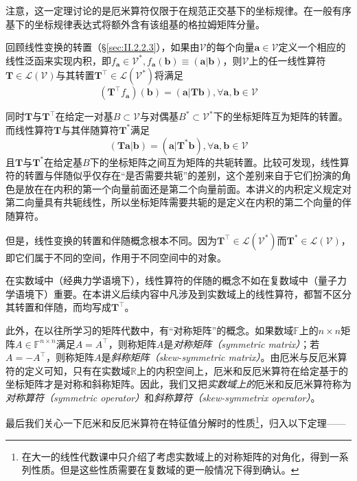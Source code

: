 \documentclass[main.tex]{subfiles}
\begin{document}
注意，这一定理讨论的是厄米算符仅限于在规范正交基下的坐标规律。在一般有序基下的坐标规律表达式将额外含有该组基的格拉姆矩阵分量。

回顾线性变换的转置（\S\ref{sec:II.2.2.3}），如果由$\mathcal{V}$的每个向量$\mathbf{a}\in\mathcal{V}$定义一个相应的线性泛函来实现内积，即$f_\mathbf{a}\in\mathcal{V}^*,f_\mathbf{a}\left(\mathbf{b}\right)\equiv\left(\mathbf{a}|\mathbf{b}\right)$，则$\mathcal{V}$上的任一线性算符$\mathbf{T}\in\mathcal{L}\left(\mathcal{V}\right)$与其转置$\mathbf{T}^\intercal\in\mathcal{L}\left(\mathcal{V}^*\right)$将满足
\[
    \left(\mathbf{T}^\intercal f_\mathbf{a}\right)\left(\mathbf{b}\right)=\left(\mathbf{a}|\mathbf{Tb}\right),\forall\mathbf{a},\mathbf{b}\in\mathcal{V}
\]

同时$\mathbf{T}$与$\mathbf{T}^\intercal$在给定一对基$B\subset\mathcal{V}$与对偶基$B^*\subset\mathcal{V}^*$下的坐标矩阵互为矩阵的转置。而线性算符$\mathbf{T}$与其伴随算符$\mathbf{T}^*$满足
\[
    \left(\mathbf{Ta}|\mathbf{b}\right)=\left(\mathbf{a}|\mathbf{T}^*\mathbf{b}\right),\forall\mathbf{a},\mathbf{b}\in\mathcal{V}
\]
且$\mathbf{T}$与$\mathbf{T}^*$在给定基$B$下的坐标矩阵之间互为矩阵的共轭转置。比较可发现，线性算符的转置与伴随似乎仅存在“是否需要共轭”的差别，这个差别来自于它们扮演的角色是放在在内积的第一个向量前面还是第二个向量前面。本讲义的内积定义规定对第二向量具有共轭线性，所以坐标矩阵需要共轭的是定义在内积的第二个向量的伴随算符。

但是，线性变换的转置和伴随概念根本不同。因为$\mathbf{T}^\intercal\in\mathcal{L}\left(\mathcal{V}^*\right)$而$\mathbf{T}^*\in\mathcal{L}\left(\mathcal{V}\right)$，即它们属于不同的空间，作用于不同空间中的对象。

在实数域中（经典力学语境下），线性算符的伴随的概念不如在复数域中（量子力学语境下）重要。在本讲义后续内容中凡涉及到实数域上的线性算符，都暂不区分其转置和伴随，而均写成$\mathbf{T}^\intercal$。

此外，在以往所学习的矩阵代数中，有“对称矩阵”的概念。如果数域$\mathbb{F}$上的$n\times n$矩阵$A\in\mathbb{F}^{n\times n}$满足$A=A^\intercal$，则称矩阵$A$是\emph{对称矩阵（symmetric matrix）}；若$A=-A^\intercal$，则称矩阵$A$是\emph{斜称矩阵（skew-symmetric matrix）}。由厄米与反厄米算符的定义可知，只有在实数域$\mathbb{R}$上的内积空间上，厄米和反厄米算符在给定基于的坐标矩阵才是对称和斜称矩阵。因此，我们又把\emph{实数域上的}厄米和反厄米算符称为\emph{对称算符（symmetric operator）}和\emph{斜称算符（skew-symmetrix operator）}。

最后我们关心一下厄米和反厄米算符在特征值分解时的性质\footnote{在大一的线性代数课中只介绍了考虑实数域上的对称矩阵的对角化\cite[\S 5.3 定理3.4~3.6、例3.4]{周胜林2012线性代数}，得到一系列性质。但是这些性质需要在复数域的更一般情况下得到确认。}，归入以下定理——
\end{document}
